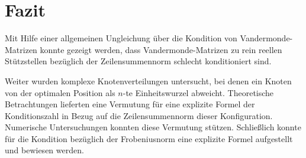 \chapter{Fazit}

Mit Hilfe einer allgemeinen Ungleichung über die Kondition von
Vandermonde-Matrizen konnte gezeigt werden, dass Vandermonde-Matrizen zu rein
reellen Stützstellen bezüglich der Zeilensummennorm schlecht konditioniert
sind.

Weiter wurden komplexe Knotenverteilungen untersucht, bei denen ein Knoten von
der optimalen Position als $n$-te Einheitswurzel abweicht.
Theoretische Betrachtungen lieferten eine Vermutung für eine explizite Formel
der Konditionszahl in Bezug auf die Zeilensummennorm dieser Konfiguration.
Numerische Untersuchungen konnten diese Vermutung stützen.
Schließlich konnte für die Kondition bezüglich der Frobeniusnorm eine
explizite Formel aufgestellt und bewiesen werden.
